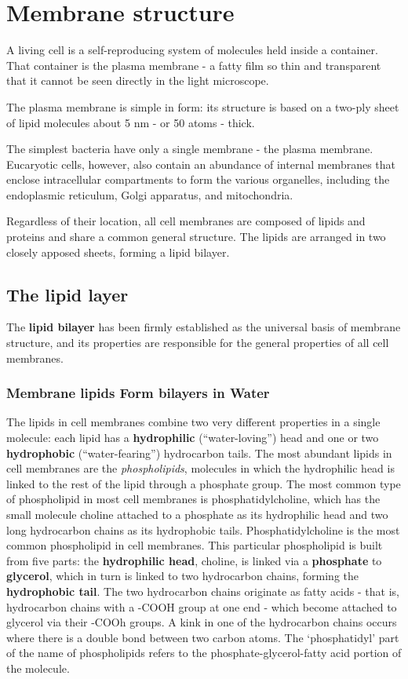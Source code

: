 \chapter{Membrane structure}

A living cell is a self-reproducing system of molecules held inside a container.
That container is the plasma membrane - a fatty film so thin and
transparent that it cannot be seen directly in the light microscope.

The plasma membrane is simple in form: its structure is based on a two-ply
sheet of lipid molecules about 5 nm - or 50 atoms - thick.

The simplest bacteria have only a single membrane - the plasma membrane.
Eucaryotic cells, however, also contain an abundance of internal
membranes that enclose intracellular compartments to form the various
organelles, including the endoplasmic reticulum, Golgi apparatus, and
mitochondria.

Regardless of their location, all cell membranes are composed of lipids
and proteins and share a common general structure. The
lipids are arranged in two closely apposed sheets, forming a lipid bilayer.

\section{The lipid layer}

The \textbf{lipid bilayer} has been firmly established as the universal basis of
membrane structure, and its properties are responsible for the general
properties of all cell membranes.

\subsection{Membrane lipids Form bilayers in Water}

The lipids in cell membranes combine two very different properties in a
single molecule: each lipid has a \textbf{hydrophilic} (“water-loving”) head and
one or two \textbf{hydrophobic} (“water-fearing”) hydrocarbon tails.
The most abundant lipids in cell membranes are the \textit{phospholipids},
molecules in which the hydrophilic head is linked to the rest of the lipid
through a phosphate group. The most common type of phospholipid
in most cell membranes is phosphatidylcholine, which has the small
molecule choline attached to a phosphate as its hydrophilic head and two
long hydrocarbon chains as its hydrophobic tails.
Phosphatidylcholine is the most common phospholipid in cell membranes.
This particular phospholipid is built from five parts: the \textbf{hydrophilic head},
choline, is linked via a \textbf{phosphate} to \textbf{glycerol}, which in turn is linked to two
hydrocarbon chains, forming the \textbf{hydrophobic tail}. The two hydrocarbon chains originate
as fatty acids - that is, hydrocarbon chains with a -COOH group at one end - which become
attached to glycerol via their -COOh groups. A kink in one of the hydrocarbon chains
occurs where there is a double bond between two carbon atoms. The ‘phosphatidyl’ part of the 
name of phospholipids refers to the phosphate-glycerol-fatty acid portion of the molecule.

